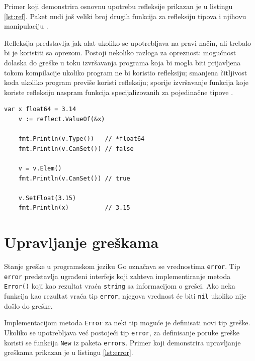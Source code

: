 \documentclass[12pt,oneside]{memoir}
\begin{document}
Primer koji demonstrira osnovnu upotrebu refleksije prikazan je u listingu \ref{lst:ref}. Paket nudi još veliki broj drugih funkcija za refleksiju tipova i njihovu manipulaciju \cite{reflect}.

Refleksija predstavlja jak alat ukoliko se upotrebljava na pravi način, ali trebalo bi je koristiti sa oprezom. Postoji nekoliko razloga za opreznost: mogućnost dolaska do greške u toku izvršavanja programa koja bi mogla biti prijavljena tokom kompilacije ukoliko program ne bi koristio refleksiju; smanjena čitljivost koda ukoliko program previše koristi refleksiju; sporije izvršavanje funkcija koje koriste refleksiju naspram funkcija specijalizovanih za pojedinačne tipove \cite{bookGoProg}.

 \begin{center}
\begin{lstlisting}[caption=Primer koji demonstrira osnovnu upotrebu refleksije, label={lst:ref},  backgroundcolor=\color{background}]
	var x float64 = 3.14
	v := reflect.ValueOf(&x) 
	
	fmt.Println(v.Type())	// *float64
	fmt.Println(v.CanSet())	// false
	
	v = v.Elem()
	fmt.Println(v.CanSet())	// true
	
	v.SetFloat(3.15)
	fmt.Println(x)			// 3.15
\end{lstlisting}
\end{center}

\section{Upravljanje greškama} \label{error}

Stanje greške u programskom jeziku Go označava se vrednostima \texttt{error}. Tip \texttt{error} predstavlja ugrađeni interfejs koji zahteva implementiranje metoda \texttt{Error()} koji kao rezultat vraća \texttt{string} sa informacijom o grešci. Ako neka funkcija kao rezultat vraća tip \texttt{error}, njegova vrednost će biti \texttt{nil} ukoliko nije došlo do greške. 

Implementacijom metoda \texttt{Error} za neki tip moguće je definisati novi tip greške. Ukoliko se upotrebljava već postojeći tip \texttt{error}, za definisanje poruke greške koristi se funkcija \texttt{New} iz paketa \texttt{errors}. Primer koji demonstrira upravljanje greškama prikazan je u listingu \ref{lst:error}.
\end{document}
